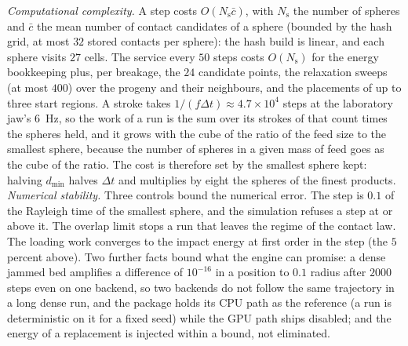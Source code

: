 

\emph{Computational complexity.} A step costs $O(N_{\mathrm s}\bar c)$, with $N_{\mathrm s}$ the number of spheres and $\bar c$ the mean number of contact candidates of a sphere (bounded by the hash grid, at most $32$ stored contacts per sphere): the hash build is linear, and each sphere visits $27$ cells. The service every $50$ steps costs $O(N_{\mathrm s})$ for the energy bookkeeping plus, per breakage,
the $24$ candidate points, the relaxation sweeps (at most $400$) over the progeny and their neighbours, and the placements of up to three start regions. A stroke takes $1/(f\Delta t)\approx4.7\times10^{4}$ steps at the laboratory jaw's $6$~Hz, so the work of a run is the sum over its strokes of that count times the spheres held, and it grows with the cube of the ratio of the feed size to the smallest sphere, because
the number of spheres in a given mass of feed goes as the cube of the ratio. The cost is therefore set by the smallest sphere kept: halving $d_{\min}$ halves $\Delta t$ and multiplies by eight the spheres of the finest products.
\emph{Numerical stability.} Three controls bound the numerical error. The step is $0.1$ of the Rayleigh time of the smallest sphere, and the simulation refuses a step at or above it. The overlap limit stops a run that leaves the regime of the contact law. The loading work converges to the impact energy at first order in the step (the $5$ percent above). Two further facts bound what the engine can promise: a dense jammed bed amplifies a difference of $10^{-16}$ in a position to
$0.1$ radius after $2000$ steps even on one backend, so two backends do not follow the same trajectory in a long dense run, and the package holds its CPU path as the reference (a run is deterministic on it for a fixed seed) while the GPU path ships disabled; and the energy of a replacement is injected within a bound, not eliminated.

